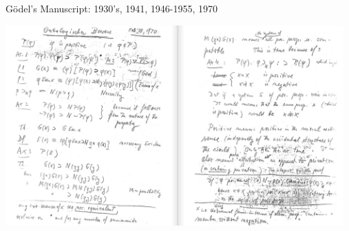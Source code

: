 

\begin{frame}{G\"odel's Manuscript: 1930's, 1941, 1946-1955, 1970}
\bigskip

\begin{changemargin}{-1.2cm}{-1.2cm}
\includegraphics[width=13cm]{Images/Manuscript.png}
\end{changemargin}
\end{frame}


